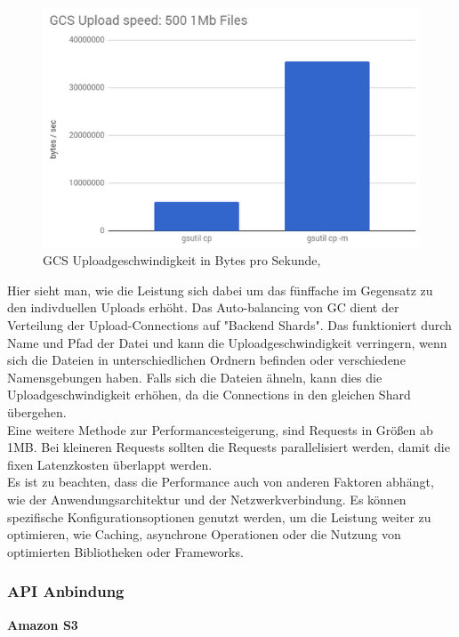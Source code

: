 \begin{figure}[!h]
	\centering
	\includegraphics[width=12cm,keepaspectratio]{Pictures/cloud-storage-performance.png}
	\caption{GCS Uploadgeschwindigkeit in Bytes pro Sekunde, }
\end{figure}

Hier sieht man, wie die Leistung sich dabei um das fünffache im Gegensatz zu den indivduellen Uploads erhöht. Das Auto-balancing von GC dient der Verteilung der Upload-Connections auf "Backend Shards". Das funktioniert durch  Name und Pfad der Datei und kann die Uploadgeschwindigkeit verringern, wenn sich die Dateien in unterschiedlichen Ordnern befinden oder verschiedene Namensgebungen haben. Falls sich die Dateien ähneln, kann dies die Uploadgeschwindigkeit erhöhen, da die Connections in den gleichen Shard übergehen.\\

Eine weitere Methode zur Performancesteigerung, sind Requests in Größen ab 1MB. Bei kleineren Requests sollten die Requests parallelisiert werden, damit die fixen Latenzkosten überlappt werden.\\
Es ist zu beachten, dass die Performance auch von anderen Faktoren abhängt, wie der Anwendungsarchitektur und der Netzwerkverbindung. Es können spezifische Konfigurationsoptionen genutzt werden, um die Leistung weiter zu optimieren, wie Caching, asynchrone Operationen oder die Nutzung von optimierten Bibliotheken oder Frameworks. 

\newpage

\subsubsection{API Anbindung}

\textbf{Amazon S3}\\

